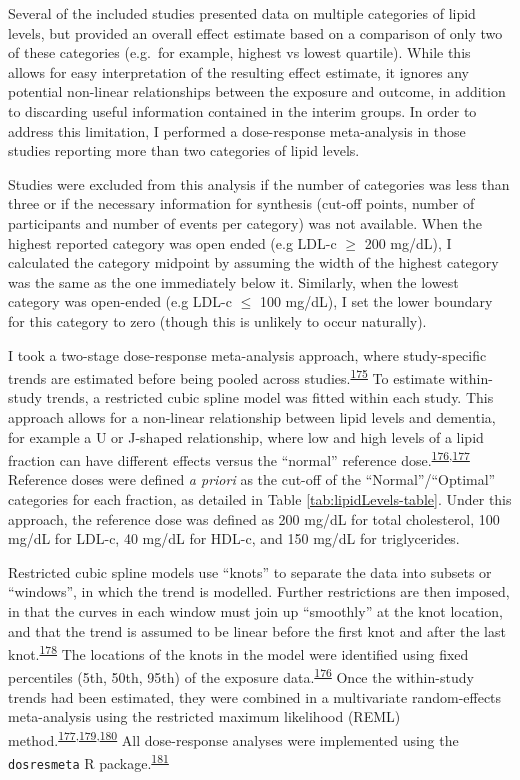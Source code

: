 \documentclass[a4paper, twoside]{templates/ociamthesis}
\begin{document}
Several of the included studies presented data on multiple categories of lipid levels, but provided an overall effect estimate based on a comparison of only two of these categories (e.g.~for example, highest vs lowest quartile). While this allows for easy interpretation of the resulting effect estimate, it ignores any potential non-linear relationships between the exposure and outcome, in addition to discarding useful information contained in the interim groups. In order to address this limitation, I performed a dose-response meta-analysis in those studies reporting more than two categories of lipid levels.

Studies were excluded from this analysis if the number of categories was less than three or if the necessary information for synthesis (cut-off points, number of participants and number of events per category) was not available. When the highest reported category was open ended (e.g LDL-c \(\geqslant\) 200 mg/dL), I calculated the category midpoint by assuming the width of the highest category was the same as the one immediately below it. Similarly, when the lowest category was open-ended (e.g LDL-c \(\leqslant\) 100 mg/dL), I set the lower boundary for this category to zero (though this is unlikely to occur naturally).

I took a two-stage dose-response meta-analysis approach, where study-specific trends are estimated before being pooled across studies.\textsuperscript{\protect\hyperlink{ref-greenland1992}{175}} To estimate within-study trends, a restricted cubic spline model was fitted within each study. This approach allows for a non-linear relationship between lipid levels and dementia, for example a U or J-shaped relationship, where low and high levels of a lipid fraction can have different effects versus the ``normal'' reference dose.\textsuperscript{\protect\hyperlink{ref-durrleman1989}{176},\protect\hyperlink{ref-liu2009}{177}} Reference doses were defined \emph{a priori} as the cut-off of the ``Normal''/``Optimal'' categories for each fraction, as detailed in Table \ref{tab:lipidLevels-table}. Under this approach, the reference dose was defined as 200 mg/dL for total cholesterol, 100 mg/dL for LDL-c, 40 mg/dL for HDL-c, and 150 mg/dL for triglycerides.

Restricted cubic spline models use ``knots'' to separate the data into subsets or ``windows'', in which the trend is modelled. Further restrictions are then imposed, in that the curves in each window must join up ``smoothly'' at the knot location, and that the trend is assumed to be linear before the first knot and after the last knot.\textsuperscript{\protect\hyperlink{ref-gauthier2020}{178}} The locations of the knots in the model were identified using fixed percentiles (5th, 50th, 95th) of the exposure data.\textsuperscript{\protect\hyperlink{ref-durrleman1989}{176}} Once the within-study trends had been estimated, they were combined in a multivariate random-effects meta-analysis using the restricted maximum likelihood (REML) method.\textsuperscript{\protect\hyperlink{ref-liu2009}{177},\protect\hyperlink{ref-white2009}{179},\protect\hyperlink{ref-gasparrini2012}{180}} All dose-response analyses were implemented using the \texttt{dosresmeta} R package.\textsuperscript{\protect\hyperlink{ref-crippa2016}{181}}
\end{document}
